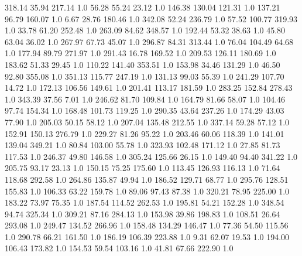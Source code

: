     318.14     35.94    217.14  1.0
     56.28     55.24     23.12  1.0
    146.38    130.04    121.31  1.0
    137.21     96.79    160.07  1.0
      6.67     28.76    180.46  1.0
    342.08     52.24    236.79  1.0
     57.52    100.77    319.93  1.0
     33.78     61.20    252.48  1.0
    263.09     84.62    348.57  1.0
    192.44     53.32     38.63  1.0
     45.80     63.04     36.02  1.0
    267.97     67.73     45.07  1.0
    296.87     84.31    313.44  1.0
     76.04    104.49     64.68  1.0
    177.94     89.79    271.97  1.0
    291.43     16.78    169.52  1.0
    209.53    126.11    180.69  1.0
    183.62     51.33     29.45  1.0
    110.22    141.40    353.51  1.0
    153.98     34.46    131.29  1.0
     46.50     92.80    355.08  1.0
    351.13    115.77    247.19  1.0
    131.13     99.03     55.39  1.0
    241.29    107.70     14.72  1.0
    172.13    106.56    149.61  1.0
    201.41    113.17    181.59  1.0
    283.25    152.84    278.43  1.0
    343.39     37.56      7.01  1.0
    246.62     81.70    109.84  1.0
    164.79     81.66     58.07  1.0
    104.46     97.74    154.34  1.0
    168.48    101.73    119.25  1.0
    290.35     43.64    237.26  1.0
    174.29     43.03     77.90  1.0
    205.03     50.15     58.12  1.0
    207.04    135.48    212.55  1.0
    337.14     59.28     57.12  1.0
    152.91    150.13    276.79  1.0
    229.27     81.26     95.22  1.0
    203.46     60.06    118.39  1.0
    141.01    139.04    349.21  1.0
     80.84    103.00     55.78  1.0
    323.93    102.48    171.12  1.0
     27.85     81.73    117.53  1.0
    246.37     49.80    146.58  1.0
    305.24    125.66     26.15  1.0
    149.40     94.40    341.22  1.0
    205.75     93.17     23.13  1.0
    150.15     75.25    175.60  1.0
    113.45    126.93    116.13  1.0
     71.64    118.68    292.58  1.0
    264.86    135.87     49.94  1.0
    186.52    129.71     68.77  1.0
    295.76    128.51    155.83  1.0
    106.33     63.22    159.78  1.0
     89.06     97.43     87.38  1.0
    320.21     78.95    225.00  1.0
    183.22     73.97     75.35  1.0
    187.54    114.52    262.53  1.0
    195.81     54.21    152.28  1.0
    348.54     94.74    325.34  1.0
    309.21     87.16    284.13  1.0
    153.98     39.86    198.83  1.0
    108.51     26.64    293.08  1.0
    249.47    134.52    266.96  1.0
    158.48    134.29    146.47  1.0
     77.36     54.50    115.56  1.0
    290.78     66.21    161.50  1.0
    186.19    106.39    223.88  1.0
      9.31     62.07     19.53  1.0
    194.00    106.43    173.82  1.0
    154.53     59.54    103.16  1.0
     41.81     67.66    222.90  1.0
